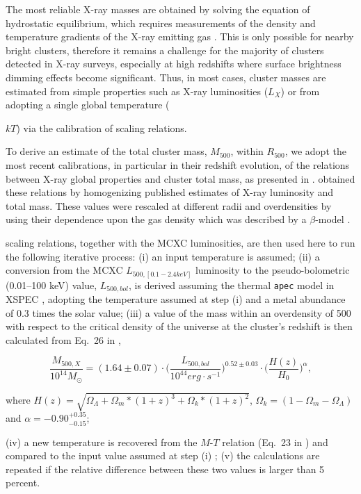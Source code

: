 \documentclass[apj,twocolumn]{emulateapj}
\begin{document}
The most reliable X-ray masses are obtained by solving the equation of hydrostatic equilibrium, which requires measurements of the density and temperature gradients of the X-ray emitting gas \citep[see discussion in][]{Maughan07}. This is only possible for nearby bright clusters, therefore it remains a challenge for the majority of clusters detected in X-ray surveys, especially at high redshifts where
surface brightness dimming effects become significant. Thus, in most cases, cluster masses are estimated from simple properties such as X-ray luminosities ($L_{X}$) or from adopting a single global temperature ({$kT$) via the calibration of scaling relations.  

To derive an estimate of the total cluster mass, $M_{500}$,  within $R_{500}$, we adopt the most recent calibrations, in particular in their redshift evolution, of the relations between X-ray global properties and cluster total mass, as presented in \cite{Reichert11}.
\citet[][see also references therein]{Reichert11} obtained these relations by homogenizing published estimates of X-ray luminosity and total mass. These values were rescaled at different radii and overdensities by using their dependence upon the gas density which was described by a $\beta$-model \citep{Cavaliere76}. 

\citet{Reichert11} scaling relations, together with the MCXC luminosities, are then used here to run the following iterative process:
(i) an input temperature is assumed; (ii) a conversion from the MCXC $L_{500, [0.1-2.4 keV]}$ luminosity to the pseudo-bolometric (0.01--100 keV) value, $L_{500, bol}$, is derived assuming the thermal {\tt apec} model in XSPEC \citep{Arnaud96}, adopting the temperature assumed at step (i) and a metal abundance of 0.3 times the solar value; (iii) a value of the mass within an overdensity of 500 with respect to the critical density of the universe at the cluster's redshift is then calculated from Eq.~26 in \cite{Reichert11},

\begin{equation}
\frac{M_{500, X}}{10^{14} M_{\odot}}=(1.64 \pm 0.07)\cdot\bigg(\frac {L_{500, bol}}{10^{44} erg \cdot s^{-1}}\bigg)^{0.52 \pm 0.03} \cdot \bigg(\frac{H(z)}{H_{0}}\bigg)^{\alpha},
\label{lum-mass equation}
\end{equation}

where $H(z)=\sqrt{\Omega_{\Lambda} +\Omega_{m}*(1+z)^3 +\Omega_{k}*(1+z)^2}$, $\Omega_{k}=(1-\Omega_{m}-\Omega_{\Lambda})$ and $\alpha=-0.90^{+0.35}_{-0.15}$;

(iv) a new temperature is recovered from the $M$-$T$ relation (Eq.~23 in \cite{Reichert11}) and compared to the input value assumed at step (i) ; (v) the calculations are repeated if the relative difference between these two values is larger than 5 percent.

}
\end{document}
